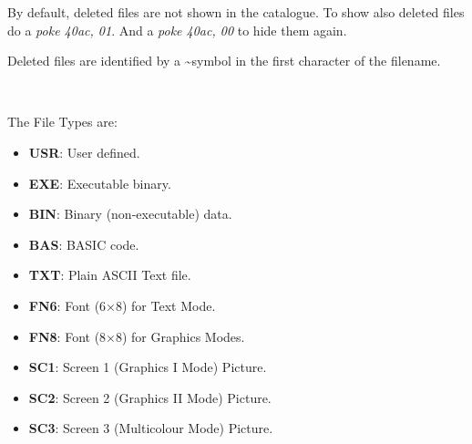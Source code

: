 \documentclass[a4paper,11pt]{article}
\begin{document}
        By default, deleted files are not shown in the catalogue. To show also
        deleted files do a \textit{poke 40ac, 01}. And a \textit{poke 40ac, 00}
        to hide them again.

        Deleted files are identified by a \textasciitilde symbol in the first
        character of the filename.

        \texttt{
        }

        The File Types are:

        \begin{itemize}
            \item \textbf{USR}: User defined.
            \item \textbf{EXE}: Executable binary.
            \item \textbf{BIN}: Binary (non-executable) data.
            \item \textbf{BAS}: BASIC code.
            \item \textbf{TXT}: Plain ASCII Text file.
            \item \textbf{FN6}: Font (6×8) for Text Mode.
            \item \textbf{FN8}: Font (8×8) for Graphics Modes.
            \item \textbf{SC1}: Screen 1 (Graphics I Mode) Picture.
            \item \textbf{SC2}: Screen 2 (Graphics II Mode) Picture.
            \item \textbf{SC3}: Screen 3 (Multicolour Mode) Picture.
        \end{itemize}

\end{document}

